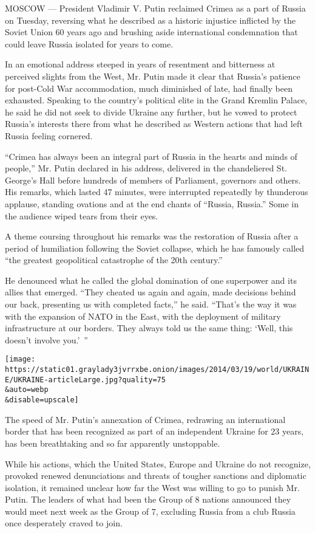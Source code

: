 MOSCOW --- President Vladimir V. Putin reclaimed Crimea as a part of
Russia on Tuesday, reversing what he described as a historic injustice
inflicted by the Soviet Union 60 years ago and brushing aside
international condemnation that could leave Russia isolated for years to
come.

In an emotional address steeped in years of resentment and bitterness at
perceived slights from the West, Mr. Putin made it clear that Russia's
patience for post-Cold War accommodation, much diminished of late, had
finally been exhausted. Speaking to the country's political elite in the
Grand Kremlin Palace, he said he did not seek to divide Ukraine any
further, but he vowed to protect Russia's interests there from what he
described as Western actions that had left Russia feeling cornered.

``Crimea has always been an integral part of Russia in the hearts and
minds of people,'' Mr. Putin declared in his address, delivered in the
chandeliered St. George's Hall before hundreds of members of Parliament,
governors and others. His remarks, which lasted 47 minutes, were
interrupted repeatedly by thunderous applause, standing ovations and at
the end chants of ``Russia, Russia.'' Some in the audience wiped tears
from their eyes.

A theme coursing throughout his remarks was the restoration of Russia
after a period of humiliation following the Soviet collapse, which he
has famously called ``the greatest geopolitical catastrophe of the 20th
century.''

He denounced what he called the global domination of one superpower and
its allies that emerged. ``They cheated us again and again, made
decisions behind our back, presenting us with completed facts,'' he
said. ``That's the way it was with the expansion of NATO in the East,
with the deployment of military infrastructure at our borders. They
always told us the same thing: `Well, this doesn't involve you.'~''

\texttt{[image: https://static01.graylady3jvrrxbe.onion/images/2014/03/19/world/UKRAINE/UKRAINE-articleLarge.jpg?quality=75\\\&auto=webp\\\&disable=upscale]}

The speed of Mr. Putin's annexation of Crimea, redrawing an
international border that has been recognized as part of an independent
Ukraine for 23 years, has been breathtaking and so far apparently
unstoppable.

While his actions, which the United States, Europe and Ukraine do not
recognize, provoked renewed denunciations and threats of tougher
sanctions and diplomatic isolation, it remained unclear how far the West
was willing to go to punish Mr. Putin. The leaders of what had been the
Group of 8 nations announced they would meet next week as the Group of
7, excluding Russia from a club Russia once desperately craved to join.

